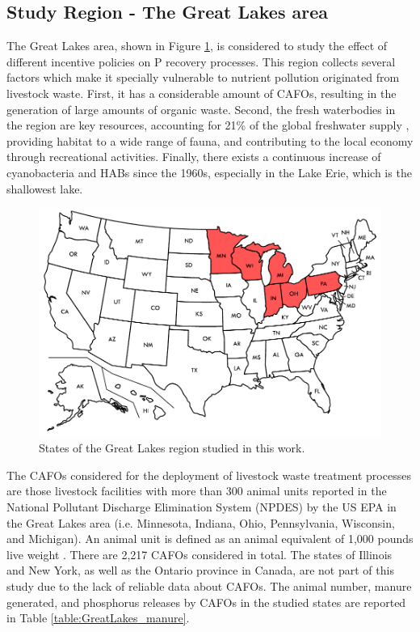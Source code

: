\begin{refsection}[referencesCh5]
\subsection{Study Region - The Great Lakes area}
The Great Lakes area, shown in Figure \ref{fig:states}, is considered to study the effect of different incentive policies on P recovery processes. This region collects several factors which make it specially vulnerable to nutrient pollution originated from livestock waste. First, it has a considerable amount of CAFOs, resulting in the generation of large amounts of organic waste. Second, the fresh waterbodies in the region are key resources, accounting for 21\% of the global freshwater supply \citep{freshwater_Great_Lakes}, providing habitat to a wide range of fauna, and contributing to the local economy through recreational activities. Finally, there exists a continuous increase of cyanobacteria and HABs since the 1960s, especially in the Lake Erie, which is the shallowest lake.

\begin{figure}[h]
	\centering
	\includegraphics[width=0.85\linewidth, trim={0cm 0cm 0cm 0cm},clip]{gfx/Chapter5/Blank_US_map_borders_labels.pdf} 
	\caption{States of the Great Lakes region studied in this work.}
	\label{fig:states}
\end{figure}

The CAFOs considered for the deployment of livestock waste treatment processes are those livestock facilities with more than 300 animal units \citep{CAFO_definition} reported in the National Pollutant Discharge Elimination System (NPDES) by the US EPA in the Great Lakes area (i.e. Minnesota, Indiana, Ohio, Pennsylvania, Wisconsin, and Michigan). An animal unit is defined as an animal equivalent of 1,000 pounds live weight \citep{animal_unit_definition}. There are 2,217 CAFOs considered in total. The states of Illinois and New York, as well as the Ontario province in Canada, are not part of this study due to the lack of reliable data about CAFOs. The animal number, manure generated, and phosphorus releases by CAFOs in the studied states are reported in Table \ref{table:GreatLakes_manure}.


\end{refsection}

